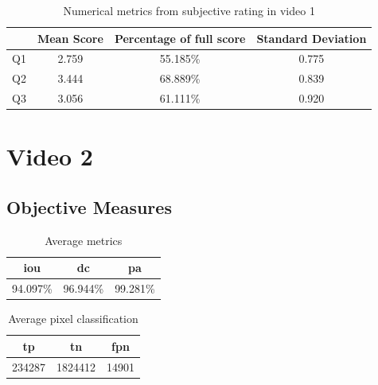 \begin{table}[H]
    \centering
    \begin{tabular}{|c|c c c|} 
        \hline
           & \textbf{Mean Score} & \textbf{Percentage of full score} & \textbf{Standard Deviation} \\ [0.5ex] 
        \hline
        Q1 & 2.759 & 55.185\% & 0.775 \\ [1ex] 
        Q2 & 3.444 & 68.889\% & 0.839 \\ [1ex] 
        Q3 & 3.056 & 61.111\% & 0.920 \\ [1ex] 
        \hline
    \end{tabular}
    \caption{Numerical metrics from subjective rating in video 1}
    \label{tab:numerical_subj_vid1}
\end{table}



\section{Video 2}
\subsection{Objective Measures}

\begin{minipage}[c]{0.475\textwidth}
\begin{table}[H]
    \centering
    \begin{tabular}{||c c c||} 
        \hline
        \acrshort{iou} & \acrshort{dc} & \acrshort{pa} \\ [0.5ex] 
        \hline\hline
        94.097\% & 96.944\% & 99.281\% \\ [1ex] 
        \hline
    \end{tabular}
    \caption{Average metrics}
    \label{tab:metrics_video_2}
\end{table}
\end{minipage}
\begin{minipage}[c]{0.475\textwidth}
\begin{table}[H]
    \centering
    \begin{tabular}{||c c c||} 
        \hline
        \acrshort{tp} & \acrshort{tn} & \acrshort{fpn} \\ [0.5ex] 
        \hline\hline
        234287 & 1824412 & 14901 \\ [1ex] 
        \hline
    \end{tabular}
    \caption{Average pixel classification}
    \label{tab:pixels_video_11}
\end{table}
\end{minipage}

